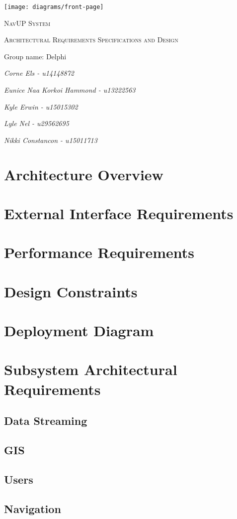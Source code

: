 \documentclass{article}
\begin{document}
\begin{titlepage}
	\centering
	\texttt{[image: diagrams/front-page]}
	\vfill
	{\scshape\LARGE NavUP System\par}
	\vfill
	{\scshape\Large Architectural Requirements Specifications and Design\par}
	\vfill
	{\Large Group name: Delphi\par}
	\bigskip 
	{\itshape\Large Corne Els - u14148872\par}	
	{\itshape\Large Eunice Naa Korkoi Hammond - u13222563\par}
	{\itshape\Large Kyle Erwin - u15015302\par}
  {\itshape\Large Lyle Nel - u29562695\par}
	{\itshape\Large Nikki Constancon - u15011713\par}
	\vfill
\end{titlepage}

\tableofcontents

\clearpage

\section{Architecture Overview}


\section{External Interface Requirements}


\section{Performance Requirements}


\section{Design Constraints}


\pagebreak
\section{Deployment Diagram}


\pagebreak
\section{Subsystem Architectural Requirements}
  \subsection{Data Streaming}
	
\clearpage
  \subsection{GIS}
	
\clearpage
  \subsection{Users}
	
\clearpage
  \subsection{Navigation}
	
\end{document}
